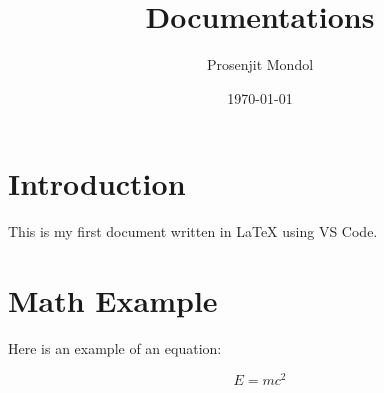 \documentclass{article}
\title{Documentations}
\author{Prosenjit Mondol}
\date{\today}
\begin{document}
\maketitle

\section{Introduction}

This is my first document written in \LaTeX{} using VS Code.

\section{Math Example}

Here is an example of an equation:

\[
E = mc^2
\]
\end{document}
